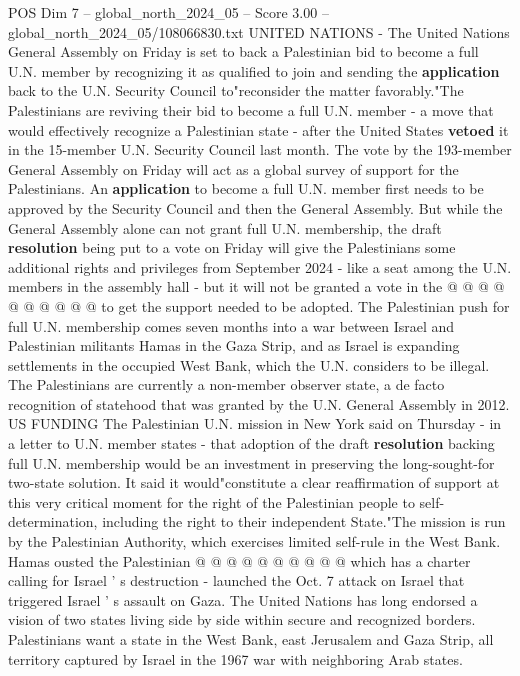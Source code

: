 \begin{textsample}{POS Dim 7 – global\_north\_2024\_05 – Score 3.00 – global\_north\_2024\_05/108066830.txt}  \label{ex:f7_pos_263}
UNITED NATIONS - The United Nations General Assembly on Friday is set to back a Palestinian bid to become a full U.N. member by recognizing it as qualified to join and sending the \textbf{application} back to the U.N.
Security Council to"reconsider the matter favorably."The Palestinians are reviving their bid to become a full U.N. member - a move that would effectively recognize a Palestinian state - after the United States \textbf{vetoed} it in the 15-member U.N.
Security Council last month.
The vote by the 193-member General Assembly on Friday will act as a global survey of support for the Palestinians.
An \textbf{application} to become a full U.N. member first needs to be approved by the Security Council and then the General Assembly.
But while the General Assembly alone can not grant full U.N. membership, the draft \textbf{resolution} being put to a vote on Friday will give the Palestinians some additional rights and privileges from September 2024 - like a seat among the U.N. members in the assembly hall - but it will not be granted a vote in the @ @ @ @ @ @ @ @ @ @ to get the support needed to be adopted.
The Palestinian push for full U.N. membership comes seven months into a war between Israel and Palestinian militants Hamas in the Gaza Strip, and as Israel is expanding settlements in the occupied West Bank, which the U.N. considers to be illegal.
The Palestinians are currently a non-member observer state, a de facto recognition of statehood that was granted by the U.N.
General Assembly in 2012.
US FUNDING The Palestinian U.N. mission in New York said on Thursday - in a letter to U.N. member states - that adoption of the draft \textbf{resolution} backing full U.N. membership would be an investment in preserving the long-sought-for two-state solution.
It said it would"constitute a clear reaffirmation of support at this very critical moment for the right of the Palestinian people to self-determination, including the right to their independent State."The mission is run by the Palestinian Authority, which exercises limited self-rule in the West Bank.
Hamas ousted the Palestinian @ @ @ @ @ @ @ @ @ @ which has a charter calling for Israel ' s destruction - launched the Oct. 7 attack on Israel that triggered Israel ' s assault on Gaza.
The United Nations has long endorsed a vision of two states living side by side within secure and recognized borders.
Palestinians want a state in the West Bank, east Jerusalem and Gaza Strip, all territory captured by Israel in the 1967 war with neighboring Arab states.

\end{textsample}
